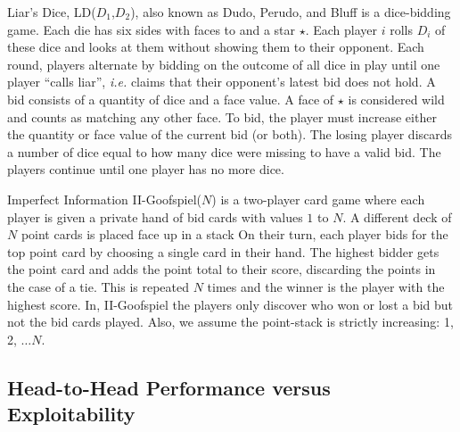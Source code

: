 \documentclass[letterpaper]{article}
\newcommand{\ie}{{\it i.e.}\xspace}
\begin{document}
Liar's Dice, LD($D_1$,$D_2$), also known as Dudo, Perudo, and Bluff is a dice-bidding game. 
Each die has six sides with faces  to  and a star $\star$. 
Each player $i$ rolls $D_i$ of these dice and looks at them without showing them to their opponent. 
Each round, players alternate by bidding on the outcome of all dice in play until one player ``calls liar'', 
\ie claims that their opponent's latest bid does not hold.
A bid consists of a quantity of dice and a face value.  
A face of $\star$ is considered wild and counts as matching any other face.
To bid, the player must increase either the quantity or face value of the current 
bid (or both). The losing player discards a number of dice equal to how many dice were missing 
to have a valid bid. The players continue until one player has no more dice.

Imperfect Information II-Goofspiel($N$) is a two-player card game where each player is
given a private hand of bid cards with values $1$ to $N$. A different
deck of $N$ point cards is placed face up in a stack 
On their turn, each player bids for the top point card by 
choosing a single card in their hand. 
The highest bidder gets the point card and adds the point total to their score, discarding
the points in the case of a tie. 
This is repeated $N$ times and the winner is the player with the highest score.
In, II-Goofspiel the players only discover who won or lost a bid but not the bid cards played.
Also, we assume the point-stack is strictly increasing: 1, 2, $\ldots N$.


\subsection{Head-to-Head Performance versus Exploitability} 
\end{document}
